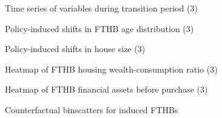 \documentclass[9pt]{beamer}
\def \sdir{stata}
\def \mdir{matlab}
\begin{document}
\begin{frame}{Time series of variables during transition period (3)}

\end{frame}

\begin{frame}{Policy-induced shifts in FTHB age distribution (3)}

\end{frame}

\begin{frame}{Policy-induced shifts in house size (3)}

\end{frame}

\begin{frame}{Heatmap of FTHB housing wealth-consumption ratio (3)}

\end{frame}

\begin{frame}{Heatmap of FTHB financial assets before purchase (3)}

\end{frame}



\begin{frame}{Counterfactual binscatters for induced FTHBs}

\end{frame}
\end{document}
